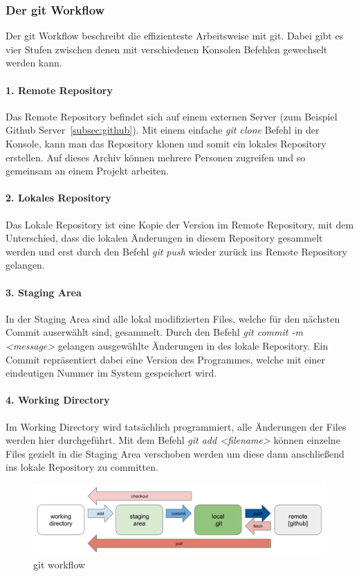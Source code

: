 \subsubsection{Der git Workflow}
Der git Workflow beschreibt die effizienteste Arbeitsweise mit git.
Dabei gibt es vier Stufen zwischen denen mit verschiedenen Konsolen Befehlen gewechselt werden kann.

\paragraph{1. Remote Repository}
Das Remote Repository befindet sich auf einem externen Server (zum Beispiel Github Server~\ref{subsec:github}).
Mit einem einfache \emph{git clone} Befehl in der Konsole, kann man das Repository klonen und somit ein lokales Repository erstellen.
Auf dieses Archiv können mehrere Personen zugreifen und so gemeinsam an einem Projekt arbeiten.

\paragraph{2. Lokales Repository}
Das Lokale Repository ist eine Kopie der Version im Remote Repository, mit dem Unterschied, dass die lokalen Änderungen in
diesem Repository gesammelt werden und erst durch den Befehl \emph{git push} wieder zurück ins Remote Repository gelangen.

\paragraph{3. Staging Area}
In der Staging Area sind alle lokal modifizierten Files, welche für den nächsten Commit auserwählt sind, gesammelt.
Durch den Befehl \emph{git commit -m <message>} gelangen ausgewählte Änderungen in des lokale Repository.
Ein Commit repräsentiert dabei eine Version des Programmes, welche mit einer eindeutigen Nummer im System gespeichert wird.

\paragraph{4. Working Directory}
Im Working Directory wird tatsächlich programmiert, alle Änderungen der Files werden hier durchgeführt.
Mit dem Befehl \emph{git add <filename>} können einzelne Files gezielt in die Staging Area verschoben werden um diese
dann anschließend ins lokale Repository zu committen.

\begin{figure}
    \centering
    \includegraphics[scale=0.4]{pics/git-workflow}
    \caption{git workflow~\cite{git-workflow}}
    \label{fig:git-workflow}
\end{figure}

